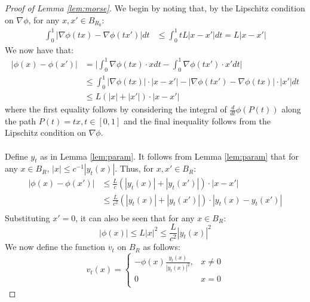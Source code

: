 \documentclass[11pt]{article}
\newcommand{\1}{\mathbf{1}}
\theoremstyle{definition}
\theoremstyle{remark}
\begin{document}
\begin{proof}[Proof of Lemma \ref{lem:morse}]
    We begin by noting that, by the Lipschitz condition on $\nabla \phi$, for any $x,x'\in B_{R_0}$:
\begin{equation}\nonumber
\begin{split}
    \int_0^1 |\nabla \phi(tx)- \nabla\phi(tx')| dt & \leq \int_0^1 tL|x-x'| dt = L |x-x'|
\end{split}
\end{equation}
We now have that:
\begin{equation}\nonumber
    \begin{split}
        |\phi(x)-\phi(x')| & = \bigg|\int_0^1 \nabla \phi(tx) \cdot x dt- \int_0^1 \nabla \phi(tx') \cdot x' dt\bigg| \\
        & \leq \int_0^1 |\nabla \phi(tx)| \cdot |x-x'| -\big|\nabla \phi(tx')-\nabla \phi(tx)\big| \cdot |x'| dt \\
        & \leq L (|x|+|x'|)\cdot |x-x'|
    \end{split}
\end{equation}
where the first equality follows by considering the integral of $\frac{d}{dt}\phi(P(t))$ along the path $P(t)=tx, t \in [0,1]$ and the final inequality follows from the Lipschitz condition on $\nabla \phi$.\\
\\
Define $y_t$ as in Lemma \ref{lem:param}. It follows from Lemma \ref{lem:param} that for any $x \in B_R$, $|x|\leq c^{-1}|y_t(x)|$. Thus, for $x,x'\in B_R$:
\begin{equation}\label{eq:phi_bdd}
\begin{split}
    |\phi(x)-\phi(x')| & \leq \frac{L}{c}(|y_t(x)|+|y_t(x')|) \cdot|x-x'| \\
   & \leq \frac{L}{c^2}(|y_t(x)|+|y_t(x')|)\cdot|y_t(x)-y_t(x')| \\
\end{split}
\end{equation}
Substituting $x'=0$, it can also be seen that for any $x \in B_R$:
\begin{equation}\label{eq:v_cts}
    |\phi(x)|\leq L|x|^2 \leq \frac{L}{c^2}|y_t(x)|^2
\end{equation}
We now define the function $v_t$ on $B_R$ as follows:
\begin{equation}\nonumber
    v_t(x) = \begin{cases}
        -\phi(x) \frac{y_t(x)}{|y_t(x)|^2}, & x \neq 0 \\
        0 & x =0\\

\end{cases}
\end{equation}
\end{proof}
\end{document}
